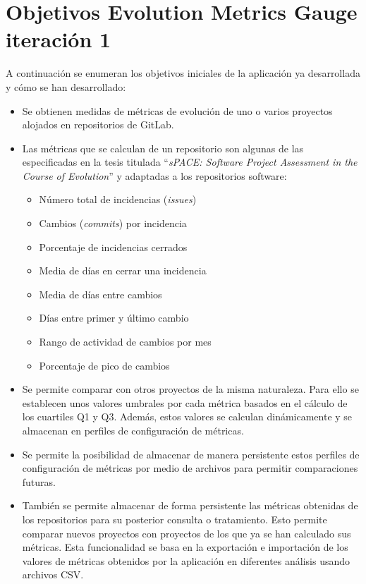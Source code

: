 \section{Objetivos Evolution Metrics Gauge iteración 1}
A continuación se enumeran los objetivos iniciales de la aplicación ya desarrollada y cómo se han desarrollado: \cite{TFGPrevio}
\begin{itemize}
	\tightlist
	\item Se obtienen medidas de métricas de evolución de uno o varios proyectos alojados en repositorios de GitLab.
	\item Las métricas que se calculan de un repositorio  son algunas de las especificadas en la tesis titulada ``\textit{sPACE: Software Project Assessment in the Course of Evolution}'' \cite{ratzinger_space:_2007} y 
	adaptadas a los repositorios software:
	\begin{itemize}
		\tightlist
		\item Número total de incidencias (\textit{issues})
		\item Cambios (\textit{commits}) por incidencia
		\item Porcentaje de incidencias cerrados
		\item Media de días en cerrar una incidencia
		\item Media de días entre cambios
		\item Días entre primer y último cambio
		\item Rango de actividad de cambios por mes
		\item Porcentaje de pico de cambios
	\end{itemize}
	\item Se permite comparar con otros proyectos de la misma naturaleza. Para ello se establecen unos valores umbrales por cada métrica basados en el cálculo de los cuartiles Q1 y Q3. Además, estos valores se calculan dinámicamente y se almacenan en perfiles de configuración de métricas.
	\item Se permite la posibilidad de almacenar de manera persistente estos perfiles de configuración de métricas por medio de archivos para permitir comparaciones futuras.
	\item También se permite almacenar de forma persistente las métricas obtenidas de los repositorios para su posterior consulta o tratamiento. Esto permite comparar nuevos proyectos con proyectos de los que ya se han calculado sus métricas.
	 Esta funcionalidad se basa en la exportación e importación de los valores de métricas obtenidos por la aplicación en diferentes análisis usando archivos CSV.
\end{itemize}


